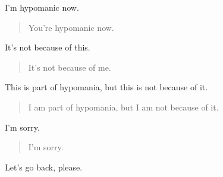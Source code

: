 I'm hypomanic now.

\begin{quote}
You're hypomanic now.
\end{quote}

It's not because of this.

\begin{quote}
It's not because of me.
\end{quote}

This is part of hypomania, but this is not because of it.

\begin{quote}
I am part of hypomania, but I am not because of it.
\end{quote}

I'm sorry.

\begin{quote}
I'm sorry.
\end{quote}

Let's go back, please.
